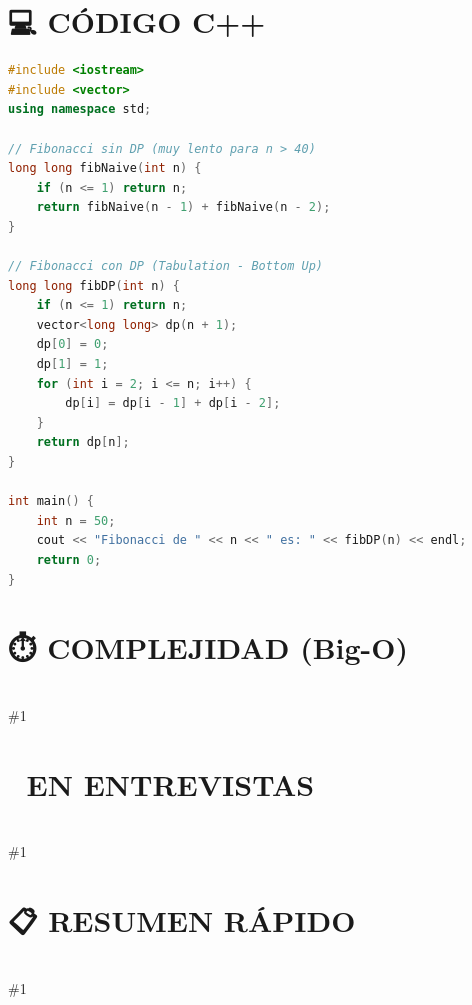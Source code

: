 \documentclass{article}
\newcommand{\complejidad}[1]{\section*{⏱️ COMPLEJIDAD (Big-O)}\hrulefill \\ \#1}
\newcommand{\entrevistas}[1]{\section*{🎯 EN ENTREVISTAS}\hrulefill \\ \#1}
\newcommand{\resumen}[1]{\section*{📋 RESUMEN RÁPIDO}\hrulefill \\ \#1}
\begin{document}
\section*{💻 CÓDIGO C++}
\hrulefill
\begin{lstlisting}[language=C++]
#include <iostream>
#include <vector>
using namespace std;

// Fibonacci sin DP (muy lento para n > 40)
long long fibNaive(int n) {
    if (n <= 1) return n;
    return fibNaive(n - 1) + fibNaive(n - 2);
}

// Fibonacci con DP (Tabulation - Bottom Up)
long long fibDP(int n) {
    if (n <= 1) return n;
    vector<long long> dp(n + 1);
    dp[0] = 0;
    dp[1] = 1;
    for (int i = 2; i <= n; i++) {
        dp[i] = dp[i - 1] + dp[i - 2];
    }
    return dp[n];
}

int main() {
    int n = 50;
    cout << "Fibonacci de " << n << " es: " << fibDP(n) << endl;
    return 0;
}
\end{lstlisting}
\complejidad{Enfoque        │ Tiempo    │ Espacio
  ───────────────┼───────────┼────────────────────────────────
  Fuerza Bruta   │ O(2\textasciicircum{}n)    │ O(n) (stack)
  DP (Memo/Tab)  │ O(n)      │ O(n) (tabla)

* La DP reduce la complejidad de exponencial a lineal en muchos casos.}
\entrevistas{}
\resumen{• DP = Recursión + Memoria.
• No calcules lo mismo dos veces.
• Overlapping Subproblems: La clave para usar DP.
• Top-Down: Fácil de pensar (recursivo).
• Bottom-Up: Más eficiente (iterativo).
• Esencial para problemas de optimización.
════════════════════════════════════════════════════════════════}
\end{document}
